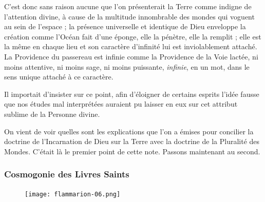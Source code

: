 \documentclass[a4paper, 11pt, oneside]{article}
\begin{document}
C'est donc sans raison aucune que l'on présenterait la Terre comme indigne de l'attention divine, à cause de la multitude innombrable des mondes qui voguent au sein de l'espace ; la présence universelle et identique de Dieu enveloppe la création comme l'Océan fait d'une éponge, elle la pénètre, elle la remplit ; elle est la même en chaque lieu et son caractère d'infinité lui est inviolablement attaché. La Providence du passereau est infinie comme la Providence de la Voie lactée, ni moins attentive, ni moins sage, ni moins puissante, \emph{infinie}, en un mot, dans le sens unique attaché à ce caractère.

Il importait d'insister sur ce point, afin d'éloigner de certains esprits l'idée fausse que nos études mal interprétées auraient pu laisser en eux sur cet attribut sublime de la Personne divine.

On vient de voir quelles sont les explications que l'on a émises pour concilier la doctrine de l'Incarnation de Dieu sur la Terre avec la doctrine de la Pluralité des Mondes. C'était là le premier point de cette note. Passons maintenant au second.

\subsubsection{Cosmogonie des Livres Saints}
\begin{figure}[H]
\centering
\texttt{[image: flammarion-06.png]}
\end{figure}
\end{document}
